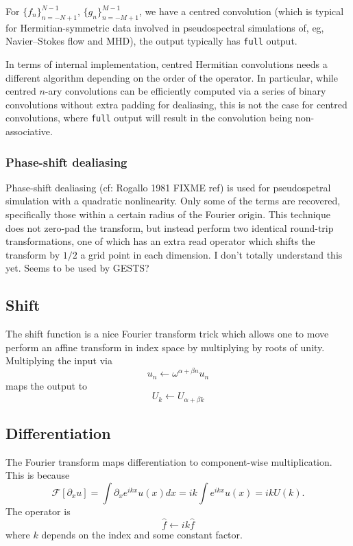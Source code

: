 \documentclass[12pt]{article}
\renewcommand{\(}{\left(}
\renewcommand{\)}{\right)}
\begin{document}
For $\{f_n\}_{n=-N+1}^{N-1}$, $\{g_n\}_{n=-M+1}^{M-1}$, we have a
centred convolution (which is typical for Hermitian-symmetric data
involved in pseudospectral simulations of, eg, Navier--Stokes flow and
MHD), the output typically has \texttt{full} output.

In terms of internal implementation, centred Hermitian convolutions
needs a different algorithm depending on the order of the operator.
In particular, while centred $n$-ary convolutions can be efficiently
computed via a series of binary convolutions without extra padding for
dealiasing, this is not the case for centred convolutions, where
\texttt{full} output will result in the convolution being
non-associative.

\subsubsection{Phase-shift dealiasing}

Phase-shift dealiasing (cf: Rogallo 1981 FIXME ref) is used for
pseudospetral simulation with a quadratic nonlinearity. Only some of
the terms are recovered, specifically those within a certain radius of
the Fourier origin.  This technique does not zero-pad the transform,
but instead perform two identical round-trip transformations, one of
which has an extra read operator which shifts the transform by $1/2$ a
grid point in each dimension.  I don't totally understand this yet.
Seems to be used by GESTS?

\subsection{Shift}

The shift function is a nice Fourier transform trick which allows one
to move perform an affine transform in index space by multiplying by
roots of unity.  Multiplying the input via
\begin{dmath}
  u_{n} \leftarrow \omega^{\alpha + \beta n} u_{n}
\end{dmath}
maps the output to
\begin{dmath}
  U_{k} \leftarrow U_{\alpha + \beta k}
\end{dmath}

\subsection{Differentiation}

The Fourier transform maps differentiation to component-wise
multiplication.  This is because
\begin{dmath}
  \mathcal{F}\left[\partial_x u\right]
  = \int  \partial_x e^{ikx} u(x) dx 
  = ik \int  e^{ikx} u(x)
  = ik U(k).
\end{dmath}
The operator is
\begin{dmath}
  \hat{f} \leftarrow i k \hat{f}
\end{dmath}
where $k$ depends on the index and some constant factor.
\end{document}
